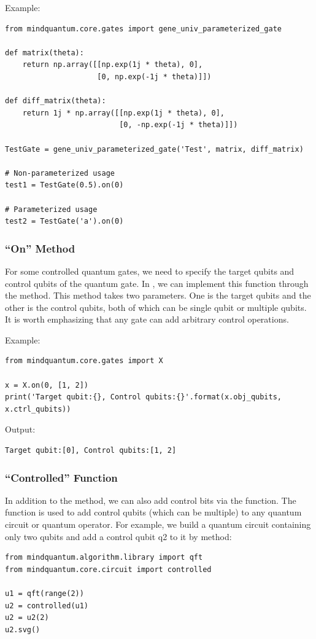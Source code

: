 Example:
\begin{lstlisting}
from mindquantum.core.gates import gene_univ_parameterized_gate

def matrix(theta):
    return np.array([[np.exp(1j * theta), 0],
                     [0, np.exp(-1j * theta)]])

def diff_matrix(theta):
    return 1j * np.array([[np.exp(1j * theta), 0],
                          [0, -np.exp(-1j * theta)]])

TestGate = gene_univ_parameterized_gate('Test', matrix, diff_matrix)

# Non-parameterized usage
test1 = TestGate(0.5).on(0)

# Parameterized usage
test2 = TestGate('a').on(0)
\end{lstlisting}

\subsubsection{``On'' Method}
For some controlled quantum gates, we need to specify the target qubits and control qubits of the quantum gate. In \MindQuantum, we can implement this function through the  method. This method takes two parameters. One is the target qubits and the other is the control qubits, both of which can be single qubit or multiple qubits. It is worth emphasizing that any gate can add arbitrary control operations.

Example:
\begin{lstlisting}
from mindquantum.core.gates import X

x = X.on(0, [1, 2])
print('Target qubit:{}, Control qubits:{}'.format(x.obj_qubits, x.ctrl_qubits))
\end{lstlisting}

Output:
\begin{lstlisting}
Target qubit:[0], Control qubits:[1, 2]
\end{lstlisting}

\subsubsection{``Controlled'' Function}
In addition to the  method, we can also add control bits via the  function. The  function is used to add control qubits (which can be multiple) to any quantum circuit or quantum operator. For example, we build a quantum circuit containing only two qubits and add a control qubit q2 to it by  method:
\begin{lstlisting}
from mindquantum.algorithm.library import qft
from mindquantum.core.circuit import controlled

u1 = qft(range(2))
u2 = controlled(u1)
u2 = u2(2)
u2.svg()
\end{lstlisting}

